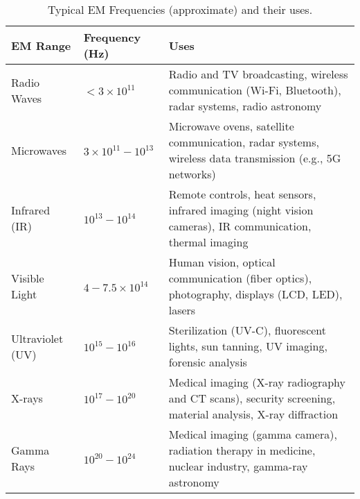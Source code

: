 \begin{table}[htbp]
	\centering
	\label{table:em-frequencies}
	\begin{tabularx}{\textwidth}{lXp{}}
		\toprule
		\textbf{EM Range} & \textbf{Frequency (Hz)} & \textbf{Uses} \\
		\midrule
		Radio Waves & $<3\times 10^{11}$ & Radio and TV broadcasting, wireless communication (Wi-Fi, Bluetooth), radar systems, radio astronomy \\
		Microwaves & $3\times 10^{11} - 10^{13}$ & Microwave ovens, satellite communication, radar systems, wireless data transmission (e.g., 5G networks) \\
		Infrared (IR) & $10^{13} - 10^{14}$ & Remote controls, heat sensors, infrared imaging (night vision cameras), IR communication, thermal imaging \\
		Visible Light & $4 - 7.5\times10^{14}$ & Human vision, optical communication (fiber optics), photography, displays (LCD, LED), lasers \\
		Ultraviolet (UV) & $10^{15} - 10^{16}$ & Sterilization (UV-C), fluorescent lights, sun tanning, UV imaging, forensic analysis \\
		X-rays & $10^{17} - 10^{20}$ & Medical imaging (X-ray radiography and CT scans), security screening, material analysis, X-ray diffraction \\
		Gamma Rays & $10^{20} - 10^{24}$ & Medical imaging (gamma camera), radiation therapy in medicine, nuclear industry, gamma-ray astronomy \\
		\bottomrule
	\end{tabularx}	
	\caption{Typical EM Frequencies (approximate) and their uses.}
\end{table}











%




%














